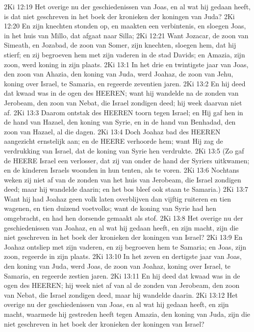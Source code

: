 2Ki 12:19  Het overige nu der geschiedenissen van Joas, en al wat hij gedaan heeft, is dat niet geschreven in het boek der kronieken der koningen van Juda?
2Ki 12:20  En zijn knechten stonden op, en maakten een verbintenis, en sloegen Joas, in het huis van Millo, dat afgaat naar Silla;
2Ki 12:21  Want Jozacar, de zoon van Simeath, en Jozabad, de zoon van Somer, zijn knechten, sloegen hem, dat hij stierf; en zij begroeven hem met zijn vaderen in de stad Davids; en Amazia, zijn zoon, werd koning in zijn plaats.
2Ki 13:1  In het drie en twintigste jaar van Joas, den zoon van Ahazia, den koning van Juda, werd Joahaz, de zoon van Jehu, koning over Israel, te Samaria, en regeerde zeventien jaren.
2Ki 13:2  En hij deed dat kwaad was in de ogen des HEEREN; want hij wandelde na de zonden van Jerobeam, den zoon van Nebat, die Israel zondigen deed; hij week daarvan niet af.
2Ki 13:3  Daarom ontstak des HEEREN toorn tegen Israel; en Hij gaf hen in de hand van Hazael, den koning van Syrie, en in de hand van Benhadad, den zoon van Hazael, al die dagen.
2Ki 13:4  Doch Joahaz bad des HEEREN aangezicht ernstelijk aan; en de HEERE verhoorde hem; want Hij zag de verdrukking van Israel, dat de koning van Syrie hen verdrukte.
2Ki 13:5  (Zo gaf de HEERE Israel een verlosser, dat zij van onder de hand der Syriers uitkwamen; en de kinderen Israels woonden in hun tenten, als te voren.
2Ki 13:6  Nochtans weken zij niet af van de zonden van het huis van Jerobeam, die Israel zondigen deed; maar hij wandelde daarin; en het bos bleef ook staan te Samaria.)
2Ki 13:7  Want hij had Joahaz geen volk laten overblijven dan vijftig ruiteren en tien wagenen, en tien duizend voetvolks; want de koning van Syrie had hen omgebracht, en had hen dorsende gemaakt als stof.
2Ki 13:8  Het overige nu der geschiedenissen van Joahaz, en al wat hij gedaan heeft, en zijn macht, zijn die niet geschreven in het boek der kronieken der koningen van Israel?
2Ki 13:9  En Joahaz ontsliep met zijn vaderen, en zij begroeven hem te Samaria; en Joas, zijn zoon, regeerde in zijn plaats.
2Ki 13:10  In het zeven en dertigste jaar van Joas, den koning van Juda, werd Joas, de zoon van Joahaz, koning over Israel, te Samaria, en regeerde zestien jaren.
2Ki 13:11  En hij deed dat kwaad was in de ogen des HEEREN; hij week niet af van al de zonden van Jerobeam, den zoon van Nebat, die Israel zondigen deed, maar hij wandelde daarin.
2Ki 13:12  Het overige nu der geschiedenissen van Joas, en al wat hij gedaan heeft, en zijn macht, waarmede hij gestreden heeft tegen Amazia, den koning van Juda, zijn die niet geschreven in het boek der kronieken der koningen van Israel?
